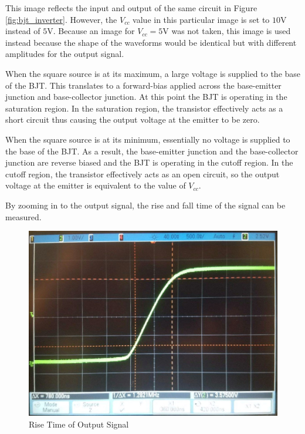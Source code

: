 {\footnotesize This image reflects the input and output of the same circuit in Figure \ref{fig:bjt_inverter}. However, the $V_{cc}$ value in this particular image is set to $10$\si{\volt} instead of $5$\si{\volt}. Because an image for $V_{cc} = 5$\si{\volt} was not taken, this image is used instead because the shape of the waveforms would be identical but with different amplitudes for the output signal.}

\FloatBarrier

When the square source is at its maximum, a large voltage is supplied to the base of the BJT. This translates to a forward-bias applied across the base-emitter junction and base-collector junction. At this point the BJT is operating in the saturation region. In the saturation region, the transistor effectively acts as a short circuit thus causing the output voltage at the emitter to be zero.

When the square source is at its minimum, essentially no voltage is supplied to the base of the BJT. As a result, the base-emitter junction and the base-collector junction are reverse biased and the BJT is operating in the cutoff region. In the cutoff region, the transistor effectively acts as an open circuit, so the output voltage at the emitter is equivalent to the value of $V_{cc}$.

By zooming in to the output signal, the rise and fall time of the signal can be measured.

\FloatBarrier
\begin{figure}[h!]
	\centering
	\includegraphics[scale=0.24]{./images/inverter_tr.jpeg}
	\caption{Rise Time of Output Signal}
	\label{fig:inverter_tr}
\end{figure}
\FloatBarrier

